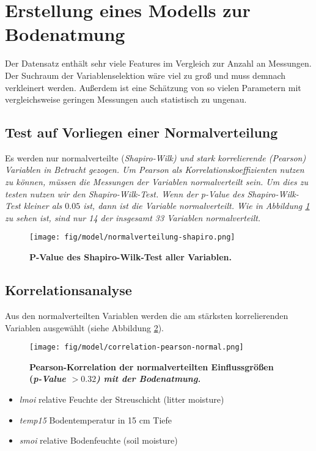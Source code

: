 \section{Erstellung eines Modells zur Bodenatmung}
\label{sec-model}

Der Datensatz enthält sehr viele Features im Vergleich zur Anzahl an Messungen.
Der Suchraum der Variablenselektion wäre viel zu groß und muss demnach verkleinert werden.
Außerdem ist eine Schätzung von so vielen Parametern mit vergleichsweise geringen Messungen auch statistisch zu ungenau.

\subsection{Test auf Vorliegen einer Normalverteilung}

Es werden nur normalverteilte (\it{Shapiro-Wilk}) und stark korrelierende (\it{Pearson}) Variablen in Betracht gezogen. Um \it{Pearson} als Korrelationskoeffizienten nutzen zu können, müssen die Messungen der Variablen normalverteilt sein. Um dies zu testen nutzen wir den \it{Shapiro-Wilk-Test}. Wenn der \it{p-Value} des \it{Shapiro-Wilk-Test} kleiner als $0.05$ ist, dann ist die Variable normalverteilt. Wie in Abbildung \ref{fig:shapiro} zu sehen ist, sind nur 14 der insgesamt 33 Variablen normalverteilt.

\begin{figure}[ht]
	\centering
	\texttt{[image: fig/model/normalverteilung-shapiro.png]}
	\caption{\bf{P-Value des Shapiro-Wilk-Test aller Variablen.}}
	\label{fig:shapiro}
\end{figure}

\subsection{Korrelationsanalyse}

Aus den normalverteilten Variablen werden die am stärksten korrelierenden Variablen ausgewählt (siehe Abbildung \ref{fig:pearson}). 

\begin{figure}
	\centering
	\texttt{[image: fig/model/correlation-pearson-normal.png]}
	\caption{\bf{Pearson-Korrelation} der normalverteilten Einflussgrößen (\it{p-Value} $> 0.32$) mit der Bodenatmung.}
    \label{fig:pearson}
\end{figure}

\begin{itemize}
\item
  \emph{lmoi} relative Feuchte der Streuschicht (litter moisture)
\item
  \emph{temp15} Bodentemperatur in 15 cm Tiefe
\item
  \emph{smoi} relative Bodenfeuchte (soil moisture)
\end{itemize}


